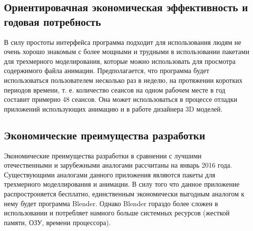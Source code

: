 \subsection{Ориентировачная экономическая эффективность и годовая потребность}
В силу простоты интерфейса программа подходит для использования людям не очень хорошо знакомым с более мощными и трудными в использовании пакетами для трехмерного моделирования, которые можно использовать для просмотра содержимого файла анимации.
Предполагается, что программа будет использоваться пользователем несколько раз в неделю, на протяжении коротких периодов времени, т. е. количество сеансов на одном рабочем месте в год составит примерно 48 сеансов. Она может использоваться в процессе отладки приложений использующих анимацию и в работе дизайнера 3D моделей.

\subsection{Экономические преимущества разработки}
Экономические преимущества разработки в сравнении с лучшими отечественными и зарубежными аналогами рассчитаны на январь 2016 года. Существующими аналогами данного приложения являются пакеты для трехмерного моделлирования и анимации. В силу того что данное приложение распростроняется бесплатно, единственным экономически выгодным аналогом к нему будет программа Blender. Однако Blender гораздо более сложен в использовании и потребляет намного больше системных ресурсов (жесткой памяти, ОЗУ, времени процессора).
